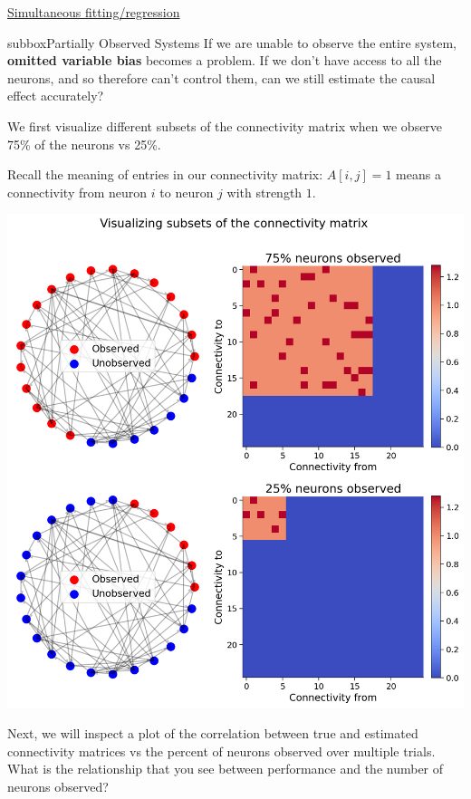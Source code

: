 \begin{textbox}{\href{https://compneuro.neuromatch.io/tutorials/W3D5_NetworkCausality/student/W3D5_Tutorial3.html}{Simultaneous fitting/regression }   }

\begin{subbox}{subbox}{Partially Observed Systems}
\scriptsize
If we are unable to observe the entire system, \textbf{omitted variable bias} becomes a problem. If we don't have access to all the neurons, and so therefore can't control them, can we still estimate the causal effect accurately?

We first visualize different subsets of the connectivity matrix when we observe 75\% of the neurons vs 25\%.

Recall the meaning of entries in our connectivity matrix: $A[i,j] = 1$ means a connectivity from neuron $i$ to neuron $j$ with strength $1$.
\begin{center}
    
\includegraphics[scale=0.24]{Figures/NC/NC_Figure15.png}

\end{center}

Next, we will inspect a plot of the correlation between true and estimated connectivity matrices vs the percent of neurons observed over multiple trials.
What is the relationship that you see between performance and the number of neurons observed?


\end{subbox}
\end{textbox}
